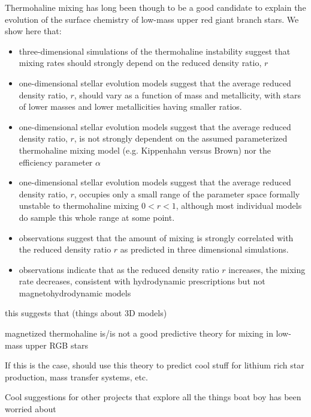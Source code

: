 Thermohaline mixing has long been though to be a good candidate to explain the evolution of the surface chemistry of low-mass upper red giant branch stars. We show here that:

\begin{itemize}
    \item three-dimensional simulations of the thermohaline instability suggest that mixing rates should strongly depend on the reduced density ratio, $r$
    
    \item one-dimensional stellar evolution models suggest that the average reduced density ratio, $r$, should vary as a function of mass and metallicity, with stars of lower masses and lower metallicities having smaller ratios.
    
    \item one-dimensional stellar evolution models suggest that the average reduced density ratio, $r$, is not strongly dependent on the assumed parameterized thermohaline mixing model (e.g. Kippenhahn versus Brown) nor the efficiency parameter $\alpha$
    
    \item one-dimensional stellar evolution models suggest that the average reduced density ratio, $r$, occupies only a small range of the parameter space formally unstable to thermohaline mixing $0<r<1$, although most individual models do sample this whole range at some point.  
    
    \item observations suggest that the amount of mixing is strongly correlated with the reduced density ratio $r$ as predicted in three dimensional simulations. 
    
    \item observations indicate that as the reduced density ratio $r$ increases, the mixing rate decreases, consistent with hydrodynamic prescriptions but not magnetohydrodynamic models
    
    \end{itemize}
    
     this suggests that (things about 3D models)
    
    magnetized thermohaline is/is not a good predictive theory for mixing in low-mass upper RGB stars

    
    If this is the case, should use this theory to predict cool stuff for lithium rich star production, mass transfer systems, etc. 
    
    Cool suggestions for other projects that explore all the things boat boy has been worried about

